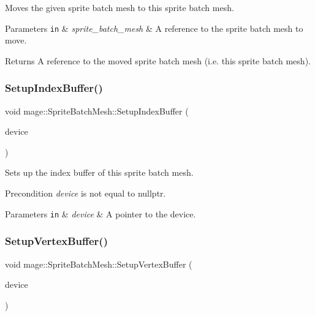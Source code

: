 Moves the given sprite batch mesh to this sprite batch mesh.


\begin{DoxyParams}[1]{Parameters}
\mbox{\tt in}  & {\em sprite\+\_\+batch\+\_\+mesh} & A reference to the sprite batch mesh to move. \\
\hline
\end{DoxyParams}
\begin{DoxyReturn}{Returns}
A reference to the moved sprite batch mesh (i.\+e. this sprite batch mesh). 
\end{DoxyReturn}
\hypertarget{classmage_1_1_sprite_batch_mesh_ab4e5400f881e5ca489fd59933401b9ce}{}\label{classmage_1_1_sprite_batch_mesh_ab4e5400f881e5ca489fd59933401b9ce} 
\subsubsection{\texorpdfstring{Setup\+Index\+Buffer()}{SetupIndexBuffer()}}
{\footnotesize\ttfamily void mage\+::\+Sprite\+Batch\+Mesh\+::\+Setup\+Index\+Buffer (\begin{DoxyParamCaption}\item[{I\+D3\+D11\+Device5 $\ast$}]{device }\end{DoxyParamCaption})\hspace{0.3cm}{\ttfamily [private]}}

Sets up the index buffer of this sprite batch mesh.

\begin{DoxyPrecond}{Precondition}
{\itshape device} is not equal to {\ttfamily nullptr}. 
\end{DoxyPrecond}

\begin{DoxyParams}[1]{Parameters}
\mbox{\tt in}  & {\em device} & A pointer to the device. \\
\hline
\end{DoxyParams}
\hypertarget{classmage_1_1_sprite_batch_mesh_a37bc0b6b46e9ea34ee8acdc1d039a050}{}\label{classmage_1_1_sprite_batch_mesh_a37bc0b6b46e9ea34ee8acdc1d039a050} 
\subsubsection{\texorpdfstring{Setup\+Vertex\+Buffer()}{SetupVertexBuffer()}}
{\footnotesize\ttfamily void mage\+::\+Sprite\+Batch\+Mesh\+::\+Setup\+Vertex\+Buffer (\begin{DoxyParamCaption}\item[{I\+D3\+D11\+Device5 $\ast$}]{device }\end{DoxyParamCaption})\hspace{0.3cm}{\ttfamily [private]}}

